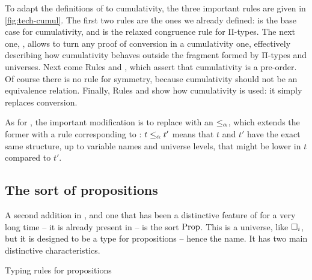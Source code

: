 To adapt the definitions of  to cumulativity,
the three important rules are given in \cref{fig:tech-cumul}.
The first two rules are the ones we already defined:  is the base case for cumulativity, and 
is the relaxed congruence rule for Π-types. The next one, , allows
to turn any proof of conversion in a cumulativity one, effectively describing how cumulativity
behaves outside the fragment formed by Π-types and universes. 
Next come Rules  and , which assert that cumulativity
is a pre-order. Of course there is no rule for symmetry, because cumulativity should not be
an equivalence relation. Finally, Rules  and  show how
cumulativity is used: it simply replaces conversion.

\AP
As for , the important modification is to replace 
with an  $\leq_{\alpha}$, which extends the former with a rule corresponding to
: $t \leq_{\alpha} t'$ means that $t$ and $t'$ have the exact
same structure, up to variable names and universe levels, that might be lower in $t$ compared
to $t'$.

\subsection{The sort of propositions}


A second addition in , and one that has been a distinctive feature of 
for a very long time – it is already present in  –
is the sort $\operatorname{Prop}$. This is a universe, like $\uni[i]$, but it is designed to
be a type for propositions – hence the name. It has two main distinctive characteristics.

\begin{marginfigure}
  \caption{Typing rules for propositions}
  \label{fig:cic-prop}
\end{marginfigure}

